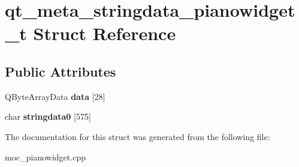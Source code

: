\hypertarget{structqt__meta__stringdata__pianowidget__t}{}\section{qt\+\_\+meta\+\_\+stringdata\+\_\+pianowidget\+\_\+t Struct Reference}
\label{structqt__meta__stringdata__pianowidget__t}
\subsection*{Public Attributes}
\begin{DoxyCompactItemize}
\item 
\mbox{\label{structqt__meta__stringdata__pianowidget__t_a7f6ed5e5103d2c91b97465d2730716ae}} 
Q\+Byte\+Array\+Data {\bfseries data} \mbox{[}28\mbox{]}
\item 
\mbox{\label{structqt__meta__stringdata__pianowidget__t_a982872787fdf4356ecb690f5adde859d}} 
char {\bfseries stringdata0} \mbox{[}575\mbox{]}
\end{DoxyCompactItemize}


The documentation for this struct was generated from the following file\+:\begin{DoxyCompactItemize}
\item 
moc\+\_\+pianowidget.\+cpp\end{DoxyCompactItemize}
